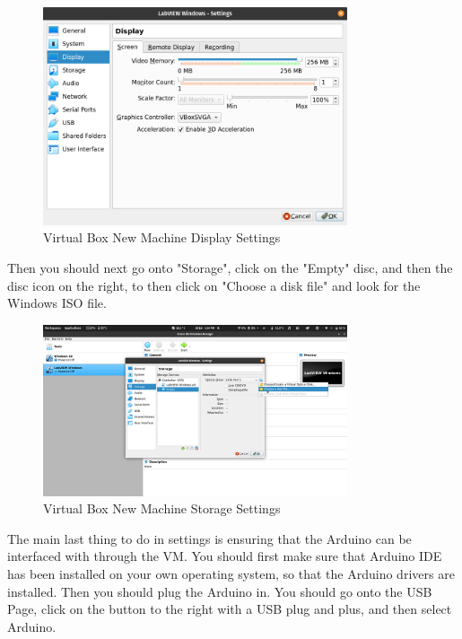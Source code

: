 \documentclass[a4paper,11pt]{report}
\begin{document}
\begin{figure}[H]
\centering
\includegraphics[width=0.8\textwidth]{screenshots/virtualboxdisplaysettings}
\caption{Virtual Box New Machine Display Settings}
\end{figure}

Then you should next go onto "Storage", click on the "Empty" disc, and then the disc icon on the right, to then click on "Choose a disk file" and look for the Windows ISO file.

\begin{figure}[H]
\centering
\includegraphics[width=0.8\textwidth]{screenshots/virtualboxstoragesettings}
\caption{Virtual Box New Machine Storage Settings}
\end{figure}

The main last thing to do in settings is ensuring that the Arduino can be interfaced with through the VM. You should first make sure that Arduino IDE has been installed on your own operating system, so that the Arduino drivers are installed. Then you should plug the Arduino in. You should go onto the USB Page, click on the button to the right with a USB plug and plus, and then select Arduino.
\end{document}
